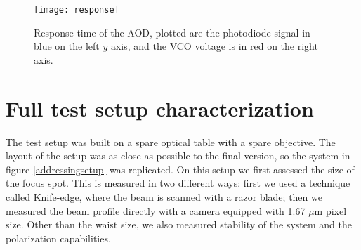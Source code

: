 \begin{figure}
\centering
\texttt{[image: response]}
\caption{Response time of the AOD, plotted are the photodiode signal in blue on the left $y$ axis, and the VCO voltage is in red on the right axis.}
\label{response}
\end{figure}

\section{Full test setup characterization}
The test setup was built on a spare optical table with a spare objective. The layout of the setup was as close as possible to the final version, so the system in figure \ref{addressingsetup} was replicated. On this setup we first assessed the size of the focus spot. This is measured in two different ways: first we used a technique called Knife-edge, where the beam is scanned with a razor blade; then we measured the beam profile directly with a camera equipped with 1.67 $\mu$m pixel size. Other than the waist size, we also measured stability of the system and the polarization capabilities.

